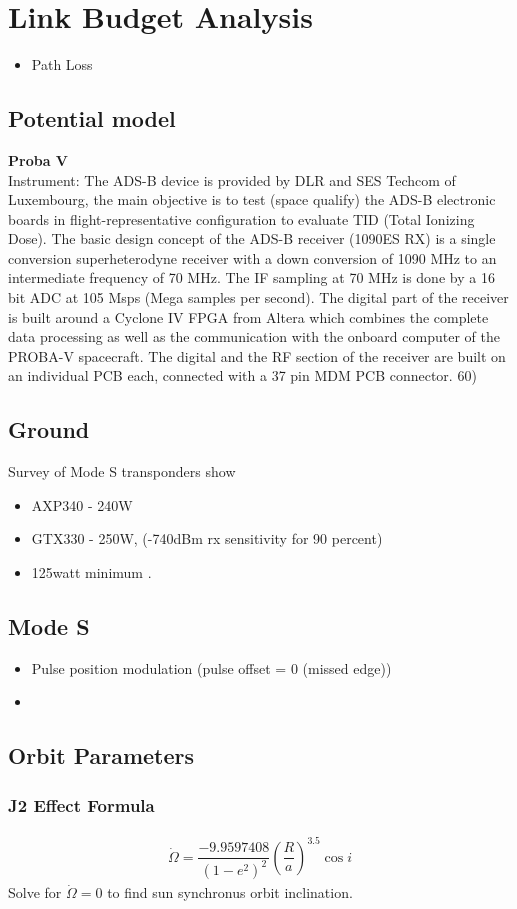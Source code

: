 \section{Link Budget Analysis}
\begin{itemize}
	\item Path Loss
\end{itemize}

\subsection{Potential model}
\textbf{Proba V} \cite{TheEuropeanSpaceAgency2013}\\
Instrument: The ADS-B device is provided by DLR and SES Techcom of Luxembourg, the main objective is to test (space qualify) the ADS-B electronic boards in flight-representative configuration to evaluate TID (Total Ionizing Dose). The basic design concept of the ADS-B receiver (1090ES RX) is a single conversion superheterodyne receiver with a down conversion of 1090 MHz to an intermediate frequency of 70 MHz. The IF sampling at 70 MHz is done by a 16 bit ADC at 105 Msps (Mega samples per second). The digital part of the receiver is built around a Cyclone IV FPGA from Altera which combines the complete data processing as well as the communication with the onboard computer of the PROBA-V spacecraft. The digital and the RF section of the receiver are built on an individual PCB each, connected with a 37 pin MDM PCB connector. 60) \

\subsection{Ground}
Survey of Mode S transponders show
\begin{itemize}
	\item AXP340 - 240W
	\item GTX330 - 250W, (-740dBm rx sensitivity for 90 percent)
	\item 125watt minimum \cite{ADSB_DOT}.
\end{itemize}

\subsection{Mode S}
\begin{itemize}
	\item Pulse position modulation (pulse offset = 0 (missed edge))
	\item 
\end{itemize}
\subsection{Orbit Parameters}
\subsubsection{J2 Effect Formula}
\begin{align}
	\dot{\Omega} = \dfrac{-9.9597408}{(1-e^2)^2} \left(\dfrac{R}{a}\right)^{3.5} \cos i
\end{align}
Solve for $\dot{\Omega} = 0$ to find sun synchronus orbit inclination.
